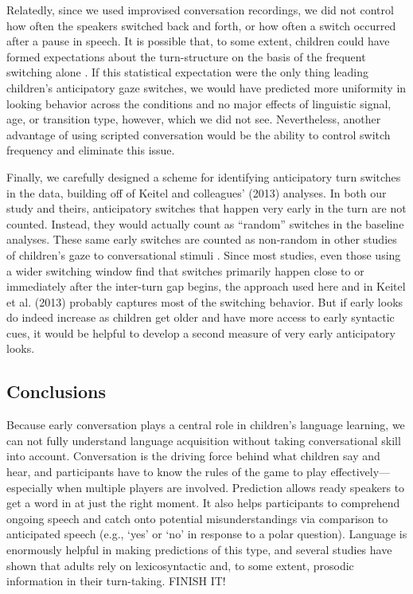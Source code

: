 \documentclass[authoryear, 12pt]{elsarticle}
\begin{document}
Relatedly, since we used improvised conversation recordings, we did not control how often the speakers switched back and forth, or how often a switch occurred after a pause in speech. It is possible that, to some extent, children could have formed expectations about the turn-structure on the basis of the frequent switching alone \citep[see, e.g., ][]{thorgrimssonUndRev}. If this statistical expectation were the only thing leading children's anticipatory gaze switches, we would have predicted more uniformity in looking behavior across the conditions and no major effects of linguistic signal, age, or transition type, however, which we did not see. Nevertheless, another advantage of using scripted conversation would be the ability to control switch frequency and eliminate this issue. 

Finally, we carefully designed a scheme for identifying anticipatory turn switches in the data, building off of Keitel and colleagues' (2013) analyses. In both our study and theirs, anticipatory switches that happen very early in the turn are not counted. Instead, they would actually count as ``random'' switches in the baseline analyses. These same early switches are counted as non-random in other studies of children's gaze to conversational stimuli \citep{bakker2011, hofsten2009}. Since most studies, even those using a wider switching window \citep[e.g., ][]{hirvenkari2013} find that switches primarily happen close to or immediately after the inter-turn gap begins, the approach used here and in Keitel et al. (2013) probably captures most of the switching behavior. But if early looks do indeed increase as children get older and have more access to early syntactic cues, it would be helpful to develop a second measure of very early anticipatory looks.

\subsection{Conclusions}

Because early conversation plays a central role in children's language learning, we can not fully understand language acquisition without taking conversational skill into account. Conversation is the driving force behind what children say and hear, and participants have to know the rules of the game to play effectively---especially when multiple players are involved. Prediction allows ready speakers to get a word in at just the right moment. It also helps participants to comprehend  ongoing speech and catch onto potential misunderstandings via comparison to anticipated speech (e.g., `yes' or `no' in response to a polar question). Language is enormously helpful in making predictions of this type, and several studies have shown that adults rely on lexicosyntactic \citep{de-ruiter2006, magyari2012} and, to some extent, prosodic information \citep{ford1996, bogelsUndRev} in their turn-taking. FINISH IT!




\end{document}
